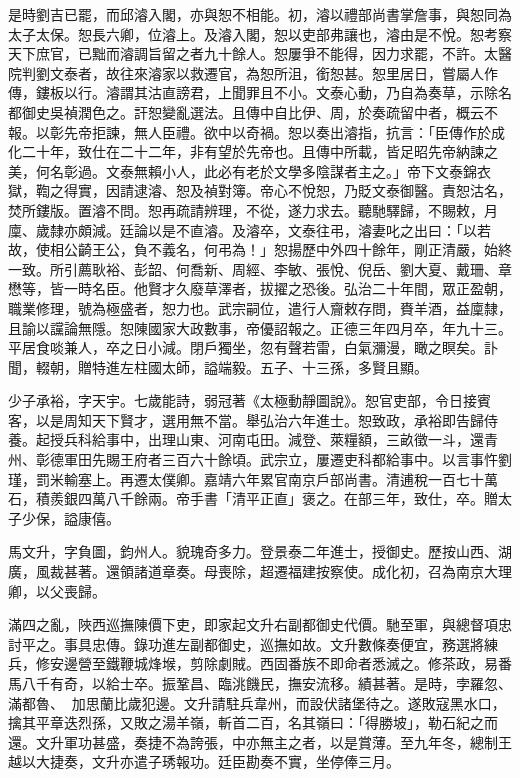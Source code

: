 \begin{pinyinscope}
是時劉吉已罷，而邱濬入閣，亦與恕不相能。初，濬以禮部尚書掌詹事，與恕同為太子太保。恕長六卿，位濬上。及濬入閣，恕以吏部弗讓也，濬由是不悅。恕考察天下庶官，已黜而濬調旨留之者九十餘人。恕屢爭不能得，因力求罷，不許。太醫院判劉文泰者，故往來濬家以救遷官，為恕所沮，銜恕甚。恕里居日，嘗屬人作傳，鏤板以行。濬謂其沽直謗君，上聞罪且不小。文泰心動，乃自為奏草，示除名都御史吳禎潤色之。訐恕變亂選法。且傳中自比伊、周，於奏疏留中者，概云不報。以彰先帝拒諫，無人臣禮。欲中以奇禍。恕以奏出濬指，抗言：「臣傳作於成化二十年，致仕在二十二年，非有望於先帝也。且傳中所載，皆足昭先帝納諫之美，何名彰過。文泰無賴小人，此必有老於文學多陰謀者主之。」帝下文泰錦衣獄，鞫之得實，因請逮濬、恕及禎對簿。帝心不悅恕，乃貶文泰御醫。責恕沽名，焚所鏤版。置濬不問。恕再疏請辨理，不從，遂力求去。聽馳驛歸，不賜敕，月廩、歲隸亦頗減。廷論以是不直濬。及濬卒，文泰往弔，濬妻叱之出曰：「以若故，使相公齮王公，負不義名，何弔為！」恕揚歷中外四十餘年，剛正清嚴，始終一致。所引薦耿裕、彭韶、何喬新、周經、李敏、張悅、倪岳、劉大夏、戴珊、章懋等，皆一時名臣。他賢才久廢草澤者，拔擢之恐後。弘治二十年間，眾正盈朝，職業修理，號為極盛者，恕力也。武宗嗣位，遣行人齎敕存問，賚羊酒，益廩隸，且諭以讜論無隱。恕陳國家大政數事，帝優詔報之。正德三年四月卒，年九十三。平居食啖兼人，卒之日小減。閉戶獨坐，忽有聲若雷，白氣瀰漫，瞰之瞑矣。訃聞，輟朝，贈特進左柱國太師，謚端毅。五子、十三孫，多賢且顯。

少子承裕，字天宇。七歲能詩，弱冠著《太極動靜圖說》。恕官吏部，令日接賓客，以是周知天下賢才，選用無不當。舉弘治六年進士。恕致政，承裕即告歸侍養。起授兵科給事中，出理山東、河南屯田。減登、萊糧額，三畝徵一斗，還青州、彰德軍田先賜王府者三百六十餘頃。武宗立，屢遷吏科都給事中。以言事忤劉瑾，罰米輸塞上。再遷太僕卿。嘉靖六年累官南京戶部尚書。清逋稅一百七十萬石，積羨銀四萬八千餘兩。帝手書「清平正直」褒之。在部三年，致仕，卒。贈太子少保，謚康僖。

馬文升，字負圖，鈞州人。貌瑰奇多力。登景泰二年進士，授御史。歷按山西、湖廣，風裁甚著。還領諸道章奏。母喪除，超遷福建按察使。成化初，召為南京大理卿，以父喪歸。

滿四之亂，陜西巡撫陳價下吏，即家起文升右副都御史代價。馳至軍，與總督項忠討平之。事具忠傳。錄功進左副都御史，巡撫如故。文升數條奏便宜，務選將練兵，修安邊營至鐵鞭城烽堠，剪除劇賊。西固番族不即命者悉滅之。修茶政，易番馬八千有奇，以給士卒。振鞏昌、臨洮饑民，撫安流移。績甚著。是時，孛羅忽、滿都魯、加思蘭比歲犯邊。文升請駐兵韋州，而設伏諸堡待之。遂敗寇黑水口，擒其平章迭烈孫，又敗之湯羊嶺，斬首二百，名其嶺曰：「得勝坡」，勒石紀之而還。文升軍功甚盛，奏捷不為誇張，中亦無主之者，以是賞薄。至九年冬，總制王越以大捷奏，文升亦遣子琇報功。廷臣勘奏不實，坐停俸三月。


\end{pinyinscope}
